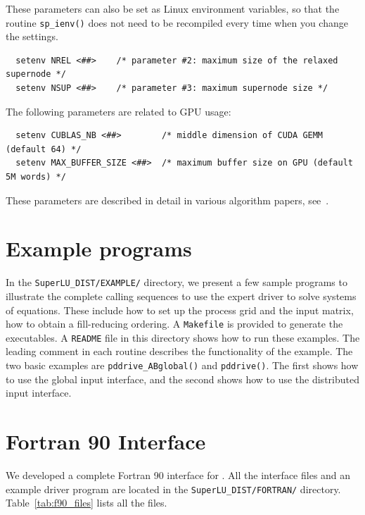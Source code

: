 These parameters can also be set as Linux environment variables, so that the
routine {\tt sp\_ienv()} does not need to be recompiled every time when you
change the settings.

\begin{verbatim}
  setenv NREL <##>    /* parameter #2: maximum size of the relaxed supernode */
  setenv NSUP <##>    /* parameter #3: maximum supernode size */
\end{verbatim}

\noindent The following parameters are related to GPU usage:

\begin{verbatim}
  setenv CUBLAS_NB <##>        /* middle dimension of CUDA GEMM (default 64) */
  setenv MAX_BUFFER_SIZE <##>  /* maximum buffer size on GPU (default 5M words) */
\end{verbatim}

These parameters are described in detail in various algorithm
papers, see~\cite{li05,sao2014}.


\section{Example programs}
In the {\tt SuperLU\_DIST/EXAMPLE/} directory, we present a few sample
programs to illustrate the complete calling sequences to use the expert
driver to solve systems of equations.
These include how to set up the process grid and the input
matrix, how to obtain a fill-reducing ordering.
A {\tt Makefile} is provided to generate the executables.
A {\tt README} file in this directory shows how to run these examples.
The leading comment in each routine describes the functionality of
the example.
The two basic examples are {\tt pddrive\_ABglobal()} and {\tt pddrive()}.
The first shows how to use the global input interface, and the
second shows how to use the distributed input interface.


\section{Fortran 90 Interface}
\label{sec:slud_fortran}
We developed a complete Fortran 90 interface for {\superlud}.
All the interface files and an example driver program are located in the 
{\tt SuperLU\_DIST/FORTRAN/} directory. 
Table~\ref{tab:f90_files} lists all the files.

